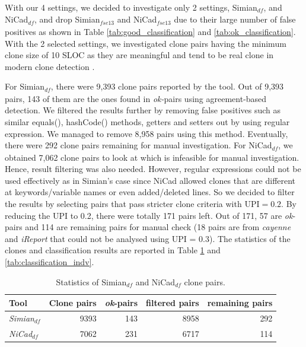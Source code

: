 \documentclass{IEEEtran}
\begin{document}
With our 4 settings, we decided to investigate only 2 settings, Simian$_{\mathrm{\textit{df}}}$, and NiCad$_{\mathrm{\textit{df}}}$, and drop Simian$_{\mathrm{\textit{fse13}}}$ and NiCad$_{\mathrm{\textit{fse13}}}$ due to their large number of false positives as shown in Table \ref{tab:good_classification} and \ref{tab:ok_classification}. With the 2 selected settings, we investigated clone pairs having the minimum clone size of 10 SLOC as they are meaningful and tend to be real clone in modern clone detection \cite{Sajnani2016}. 

For Simian$_{\mathrm{\textit{df}}}$, there were 9,393 clone pairs reported by the tool. Out of 9,393 pairs, 143 of them are the ones found in \textit{ok-}pairs using agreement-based detection. We filtered the results further by removing false positives such as similar equals(), hashCode() methods, getters and setters out by using regular expression. We managed to remove 8,958 pairs using this method. Eventually, there were 292 clone pairs remaining for manual investigation. For NiCad$_{\mathrm{\textit{df}}}$, we obtained 7,062 clone pairs to look at which is infeasible for manual investigation. Hence, result filtering was also needed. However, regular expressions could not be used effectively as in Simian's case since NiCad allowed clones that are different at keywords/variable names or even added/deleted lines. So we decided to filter the results by selecting pairs that pass stricter clone criteria with $\mathrm{UPI} = 0.2$. By reducing the UPI to 0.2, there were totally 171 pairs left. Out of 171, 57 are \textit{ok}-pairs and 114 are remaining pairs for manual check (18 pairs are from \textit{cayenne} and \textit{iReport} that could not be analysed using UPI = 0.3). The statistics of the clones and classification results are reported in Table \ref{tab:classification_indv_stats} and \ref{tab:classification_indv}.


\begin{table}[H]
	\centering
	\caption{Statistics of Simian$_{\mathrm{\textit{df}}}$ and NiCad$_{\mathrm{\textit{df}}}$ clone pairs.}
	\label{tab:classification_indv_stats}
	\begin{tabular}{l|r|r|r|r}
		\hline 
		Tool & Clone pairs & \textit{ok}-pairs & filtered pairs & remaining pairs \\ 
		\hline 
		\multirow{1}{*}{\textit{Simian$_{\mathrm{\textit{df}}}$}} & 9393 & 143 & 8958 & 292 \\
		\hline
		\multirow{1}{*}{\textit{NiCad$_{\mathrm{\textit{df}}}$}} & 7062  & 231 & 6717 & 114 \\
		\hline
	\end{tabular} 
\end{table}
\end{document}
